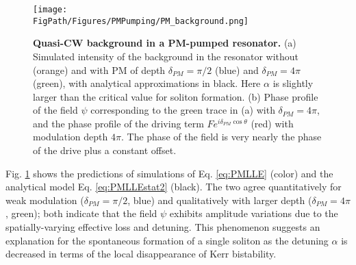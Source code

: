 \begin{figure}[htpb]
	\begin{center}
		\texttt{[image: \\FigPath/Figures/PMPumping/PM\_background.png]}
	\end{center}
	\caption[Quasi-CW background in a PM-pumped resonator]{\textbf{Quasi-CW background in a PM-pumped resonator.} (a) Simulated intensity of the background in the resonator without (orange) and with PM of depth $\delta_{PM}=\pi/2$ (blue) and $\delta_{PM}=4\pi$ (green), with analytical approximations in black. Here $\alpha$ is slightly larger than the critical value for soliton formation. (b) Phase profile of the field $\psi$ corresponding to the green trace in (a) with $\delta_{PM}=4\pi$, and the phase profile of the driving term $Fe^{i\delta_{PM}\cos{\theta}}$ (red) with modulation depth $4\pi$. The phase of the field is very nearly the phase of the drive plus a constant offset.}
	\label{fig:PMbackground}
\end{figure} 

Fig. \ref{fig:PMbackground} shows the predictions of simulations of Eq. \ref{eq:PMLLE} (color) and the analytical model Eq. \ref{eq:PMLLEstat2} (black). The two agree quantitatively for weak modulation ($\delta_{PM}=\pi/2$, blue) and qualitatively with larger depth ($\delta_{PM}=4\pi$, green); both indicate that the field $\psi$ exhibits amplitude variations due to the spatially-varying effective loss and detuning. This phenomenon suggests an explanation for the spontaneous formation of a single soliton as the detuning $\alpha$ is decreased in terms of the local disappearance of Kerr bistability.

